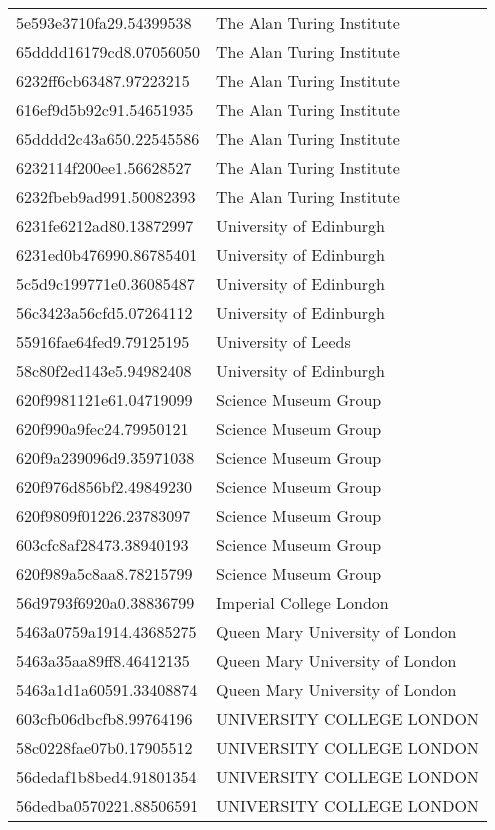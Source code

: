 \begin{tabular}{ll}
5e593e3710fa29.54399538 & The Alan Turing Institute \\
65dddd16179cd8.07056050 & The Alan Turing Institute \\
6232ff6cb63487.97223215 & The Alan Turing Institute \\
616ef9d5b92c91.54651935 & The Alan Turing Institute \\
65dddd2c43a650.22545586 & The Alan Turing Institute \\
6232114f200ee1.56628527 & The Alan Turing Institute \\
6232fbeb9ad991.50082393 & The Alan Turing Institute \\
6231fe6212ad80.13872997 & University of Edinburgh \\
6231ed0b476990.86785401 & University of Edinburgh \\
5c5d9c199771e0.36085487 & University of Edinburgh \\
56c3423a56cfd5.07264112 & University of Edinburgh \\
55916fae64fed9.79125195 & University of Leeds \\
58c80f2ed143e5.94982408 & University of Edinburgh \\
620f9981121e61.04719099 & Science Museum Group \\
620f990a9fec24.79950121 & Science Museum Group \\
620f9a239096d9.35971038 & Science Museum Group \\
620f976d856bf2.49849230 & Science Museum Group \\
620f9809f01226.23783097 & Science Museum Group \\
603cfc8af28473.38940193 & Science Museum Group \\
620f989a5c8aa8.78215799 & Science Museum Group \\
56d9793f6920a0.38836799 & Imperial College London \\
5463a0759a1914.43685275 & Queen Mary University of London \\
5463a35aa89ff8.46412135 & Queen Mary University of London \\
5463a1d1a60591.33408874 & Queen Mary University of London \\
603cfb06dbcfb8.99764196 & UNIVERSITY COLLEGE LONDON \\
58c0228fae07b0.17905512 & UNIVERSITY COLLEGE LONDON \\
56dedaf1b8bed4.91801354 & UNIVERSITY COLLEGE LONDON \\
56dedba0570221.88506591 & UNIVERSITY COLLEGE LONDON \\

\end{tabular}

